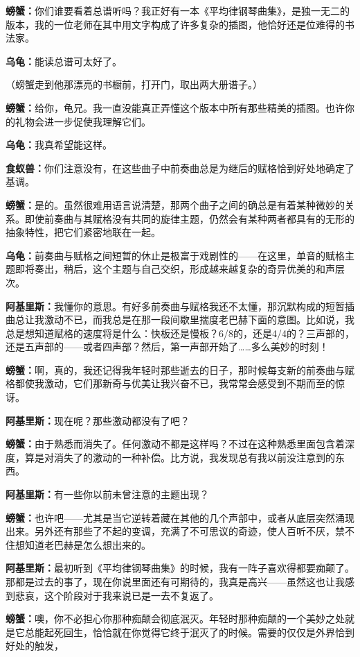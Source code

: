 \documentclass[
  12pt,
  twoside,
  openright,
  oldfontcommands,
]{memoir}
\newcommand{\dialogname}[1]{{\heifamily\bfseries #1}}
\begin{document}
\dialogname{螃蟹：}你们谁要看着总谱听吗？我正好有一本《平均律钢琴曲集》，是独一无二的版本，我的一位老师在其中用文字构成了许多复杂的插图，他恰好还是位难得的书法家。

\dialogname{乌龟：}能读总谱可太好了。

（螃蟹走到他那漂亮的书橱前，打开门，取出两大册谱子。）

\dialogname{螃蟹：}给你，龟兄。我一直没能真正弄懂这个版本中所有那些精美的插图。也许你的礼物会进一步促使我理解它们。

\dialogname{乌龟：}我真希望能这样。

\dialogname{食蚁兽：}你们注意没有，在这些曲子中前奏曲总是为继后的赋格恰到好处地确定了基调。

\dialogname{螃蟹：}是的。虽然很难用语言说清楚，那两个曲子之间的确总是有着某种微妙的关系。即使前奏曲与其赋格没有共同的旋律主题，仍然会有某种两者都具有的无形的抽象特性，把它们紧密地联在一起。

\dialogname{乌龟：}前奏曲与赋格之间短暂的休止是极富于戏剧性的------在这里，单音的赋格主题即将奏出，稍后，这个主题与自己交织，形成越来越复杂的奇异优美的和声层次。

\dialogname{阿基里斯：}我懂你的意思。有好多前奏曲与赋格我还不太懂，那沉默构成的短暂插曲总让我激动不已，而我总是在那一段间歇里揣度老巴赫下面的意图。比如说，我总是想知道赋格的速度将是什么：快板还是慢板？6/8的，还是4/4的？三声部的，还是五声部的------或者四声部？然后，第一声部开始了\ldots\ldots 多么美妙的时刻！

\dialogname{螃蟹：}啊，真的，我还记得我年轻时那些逝去的日子，那时候每支新的前奏曲与赋格都使我激动，它们那新奇与优美让我兴奋不已，我常常会感受到不期而至的惊讶。

\dialogname{阿基里斯：}现在呢？那些激动都没有了吧？

\dialogname{螃蟹：}由于熟悉而消失了。任何激动不都是这样吗？不过在这种熟悉里面包含着深度，算是对消失了的激动的一种补偿。比方说，我发现总有我以前没注意到的东西。

\dialogname{阿基里斯：}有一些你以前未曾注意的主题出现？

\dialogname{螃蟹：}也许吧------尤其是当它逆转着藏在其他的几个声部中，或者从底层突然涌现出来。另外还有那些了不起的变调，充满了不可思议的奇迹，使人百听不厌，禁不住想知道老巴赫是怎么想出来的。

\dialogname{阿基里斯：}最初听到《平均律钢琴曲集》的时候，我有一阵子喜欢得都要痴颠了。那都是过去的事了，现在你说里面还有可期待的，我真是高兴------虽然这也让我感到悲哀，这个阶段对于我来说已是一去不复返了。

\dialogname{螃蟹：}噢，你不必担心你那种痴颠会彻底泯灭。年轻时那种痴颠的一个美妙之处就是它总能起死回生，恰恰就在你觉得它终于泯灭了的时候。需要的仅仅是外界恰到好处的触发，
\end{document}
